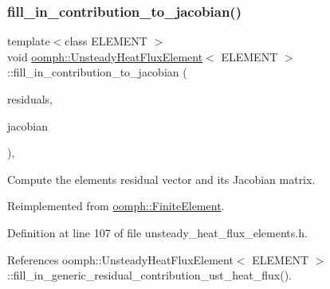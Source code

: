 \subsubsection{\texorpdfstring{fill\+\_\+in\+\_\+contribution\+\_\+to\+\_\+jacobian()}{fill\_in\_contribution\_to\_jacobian()}}
{\footnotesize\ttfamily template$<$class E\+L\+E\+M\+E\+NT $>$ \\
void \hyperlink{classoomph_1_1UnsteadyHeatFluxElement}{oomph\+::\+Unsteady\+Heat\+Flux\+Element}$<$ E\+L\+E\+M\+E\+NT $>$\+::fill\+\_\+in\+\_\+contribution\+\_\+to\+\_\+jacobian (\begin{DoxyParamCaption}\item[{\hyperlink{classoomph_1_1Vector}{Vector}$<$ double $>$ \&}]{residuals,  }\item[{\hyperlink{classoomph_1_1DenseMatrix}{Dense\+Matrix}$<$ double $>$ \&}]{jacobian }\end{DoxyParamCaption})\hspace{0.3cm}{\ttfamily [inline]}, {\ttfamily [virtual]}}



Compute the element\textquotesingle{}s residual vector and its Jacobian matrix. 



Reimplemented from \hyperlink{classoomph_1_1FiniteElement_a0ae7af222af38a0d53bf283dc85bdfea}{oomph\+::\+Finite\+Element}.



Definition at line 107 of file unsteady\+\_\+heat\+\_\+flux\+\_\+elements.\+h.



References oomph\+::\+Unsteady\+Heat\+Flux\+Element$<$ E\+L\+E\+M\+E\+N\+T $>$\+::fill\+\_\+in\+\_\+generic\+\_\+residual\+\_\+contribution\+\_\+ust\+\_\+heat\+\_\+flux().

\mbox{\label{classoomph_1_1UnsteadyHeatFluxElement_a6036eb80ba835cb022d0e31688732100}} 

